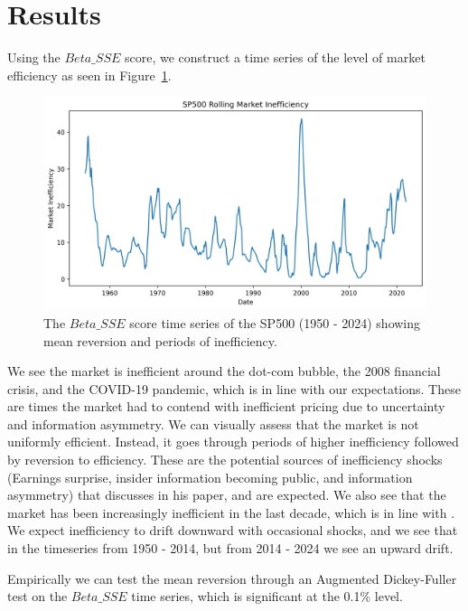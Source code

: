 \section{Results}
\label{sec:results}

Using the $Beta\_SSE$ score, we construct a time series of the level of market efficiency as seen in Figure~\ref{fig:sp_500_SSE_beta_ts}.
\begin{figure}[h!]
    \centering
    \includegraphics[width=1\textwidth]{../figs/SP500 Rolling Market Inefficiency.png}
    \caption{The $Beta\_SSE$ score time series of the SP500 (1950 - 2024) showing mean reversion and periods of inefficiency.}
    \label{fig:sp_500_SSE_beta_ts}
\end{figure}

We see the market is inefficient around the dot-com bubble, the 2008 financial crisis, and the COVID-19 pandemic, which is in line with our expectations.
These are times the market had to contend with inefficient pricing due to uncertainty and information asymmetry.
We can visually assess that the market is not uniformly efficient. Instead, it goes through periods of higher inefficiency followed by reversion to efficiency.
These are the potential sources of inefficiency shocks (Earnings surprise, insider information becoming public, and information asymmetry) that \citet{fama_EMH} discusses in his paper, and are expected.
We also see that the market has been increasingly inefficient in the last decade, which is in line with \citet{asness_2024}.
We expect inefficiency to drift downward with occasional shocks, and we see that in the timeseries from 1950 - 2014, but from 2014 - 2024 we see an upward drift.

Empirically we can test the mean reversion through an Augmented Dickey-Fuller test \citep{cheung1995lag} on the $Beta\_SSE$ time series, which is significant at the 0.1\% level.

